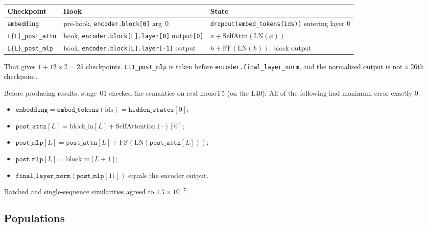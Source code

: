 \documentclass[11pt]{article}
\begin{document}
\begin{center}
\begin{tabular}{@{}lll@{}}
\toprule
Checkpoint & Hook & State \\
\midrule
\texttt{embedding} & pre-hook, \texttt{encoder.block[0]} arg~0 & \texttt{dropout(embed\_tokens(ids))} entering layer 0 \\
\texttt{L\{L\}\_post\_attn} & hook, \texttt{encoder.block[L].layer[0]} \texttt{output[0]} & $x+\mathrm{SelfAttn}(\mathrm{LN}(x))$ \\
\texttt{L\{L\}\_post\_mlp} & hook, \texttt{encoder.block[L].layer[-1]} output & $h+\mathrm{FF}(\mathrm{LN}(h))$, block output \\
\bottomrule
\end{tabular}
\end{center}

That gives $1+12\times2=25$ checkpoints. \texttt{L11\_post\_mlp} is taken before
\texttt{encoder.final\_layer\_norm}, and the normalised output is not a 26th checkpoint.

Before producing results, stage~01 checked the semantics on real monoT5 (on the L40).
All of the following had maximum error exactly $0$:
\begin{itemize}[nosep]
  \item $\texttt{embedding}=\texttt{embed\_tokens}(\mathrm{ids})=\texttt{hidden\_states}[0]$;
  \item $\texttt{post\_attn}[L]=\mathrm{block\_in}[L]+\mathrm{SelfAttention}(\cdot)[0]$;
  \item $\texttt{post\_mlp}[L]=\texttt{post\_attn}[L]+\mathrm{FF}(\mathrm{LN}(\texttt{post\_attn}[L]))$;
  \item $\texttt{post\_mlp}[L]=\mathrm{block\_in}[L{+}1]$;
  \item $\texttt{final\_layer\_norm}(\texttt{post\_mlp}[11])$ equals the encoder output.
\end{itemize}
Batched and single-sequence similarities agreed to $1.7\times10^{-7}$.

\subsection{Populations}
\end{document}
